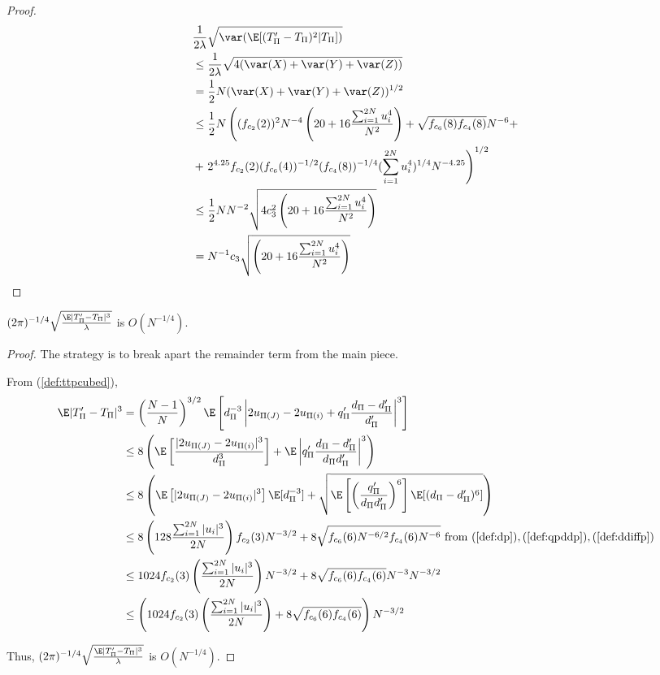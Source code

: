 \begin{proof}
  \begin{align*}
    &\frac{1}{2\lambda} \sqrt{\var (\E [(T_{\Pi}'-T_{\Pi})^2|T_{\Pi}])} \\
    &\leq \frac{1}{2\lambda} \sqrt{4(\var(X) + \var(Y) + \var(Z))} \\
    &= \frac{1}{2}N (\var(X) + \var(Y) + \var(Z))^{1/2} \\
    &\leq \frac{1}{2}N \left ((f_{c_2}(2))^2 N^{-4} \left (20 + 16\frac{\sum_{i=1}^{2N}
        u_{i}^4}{N^2} \right )
    + \sqrt{f_{c_6}(8)f_{c_4}(8)}N^{-6} + \right . \\
  &+ \left . 2^{4.25}f_{c_2}(2) (f_{c_6}(4))^{-1/2} (f_{c_4}(8))^{-1/4}
    (\sum_{i=1}^{2N}u_{i}^4)^{1/4} N^{-4.25}\right )^{1/2} \\
  &\leq \frac{1}{2}N N^{-2} \sqrt{4c_3^2 \left (20 + 16\frac{\sum_{i=1}^{2N}
        u_{i}^4}{N^2} \right )} \\
  &= N^{-1} c_3\sqrt{\left (20 + 16\frac{\sum_{i=1}^{2N} u_{i}^4}{N^2} \right )} \\
  \end{align*}

\end{proof}

\begin{proposition}
  $(2\pi)^{-1/4}\sqrt{\frac{\E|T_{\Pi}'-T_{\Pi}|^3}{\lambda}}$ is $O(N^{-1/4})$.
\end{proposition}
\begin{proof}
  The strategy is to break apart the remainder term from the main piece.  

  From (\ref{def:ttpcubed}),
  \begin{align*}
    \E|T_{\Pi}'-T_{\Pi}|^3 
    &= \left (\frac{N-1}{N}\right )^{3/2}
    \E \left [d_{\Pi}^{-3} \left |2u_{\Pi(J)}-2u_{\Pi(i)}+q_{\Pi}'\frac{d_{\Pi}-d_{\Pi}'}{d_{\Pi}'} \right |^3
    \right ] \\
    &\leq 8 \left (
      \E \left [ \frac{|2u_{\Pi(J)}-2u_{\Pi(i)}|^3}{d_{\Pi}^3} \right ] + 
      \E \left | q_{\Pi}'\frac{d_{\Pi}-d_{\Pi}'}{d_{\Pi}d_{\Pi}'} \right |^3 \right ) \\
    &\leq 8 \left (
      \E \left [ |2u_{\Pi(J)}-2u_{\Pi(i)}|^3 \right ] \E [d_{\Pi}^{-3}] + 
      \sqrt{\E \left [ \left ( \frac{q_{\Pi}'}{d_{\Pi}d_{\Pi}'} \right )^6 \right ]  \E
        [(d_{\Pi}-d_{\Pi}')^6]} \right ) \\
    &\leq 8 \left ( 128 \frac{\sum_{i=1}^{2N} |u_{i}|^3}{2N} \right )
    f_{c_2}(3) N^{-3/2} + 
    8 \sqrt{f_{c_6}(6) N^{-6/2} f_{c_4}(6) N^{-6}} \text{ from } 
    (\ref{def:dp}),(\ref{def:qpddp}),(\ref{def:ddiffp}) \\
    &\leq 1024 f_{c_2}(3) \left ( \frac{\sum_{i=1}^{2N} |u_{i}|^3}{2N}
    \right ) N^{-3/2} + 8 \sqrt{f_{c_6}(6)f_{c_4}(6)} N^{-3} N^{-3/2} \\
    &\leq \left ( 1024 f_{c_2}(3) \left ( \frac{\sum_{i=1}^{2N} |u_{i}|^3}{2N}
    \right ) + 8 \sqrt{f_{c_6}(6)f_{c_4}(6)} \right ) N^{-3/2}
  \end{align*}

  Thus, $(2\pi)^{-1/4}\sqrt{\frac{\E|T_{\Pi}'-T_{\Pi}|^3}{\lambda}}$ is $O(N^{-1/4})$.
\end{proof}

